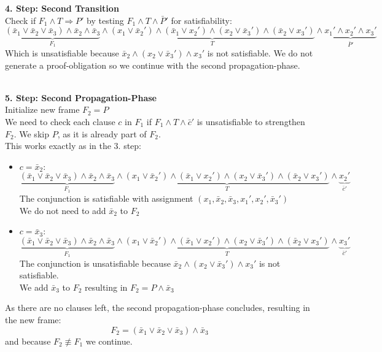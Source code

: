 \documentclass[11pt, a4paper, BCOR=10mm, ngerman]{scrbook}
\begin{document}
\textbf{4. Step: Second Transition} \\
Check if $F_1 \land T \Rightarrow P'$ by testing $F_1 \land T \land \bar P'$ for satisfiability: 
\begin{equation*}
\underbrace{(\bar x_1 \lor \bar x_2 \lor \bar x_3) \land \bar x_2 \land \bar x_3}_{F_1} \land \underbrace{(x_1 \lor \bar x_2' ) \land ( \bar x_1 \lor x_2') \land (x_2 \lor \bar x_3') \land ( \bar x_2 \lor x_3')}_{T} \land \underbrace{x_1' \land x_2' \land x_3'}_{ \bar P'}
\end{equation*}
Which is unsatisfiable because $\bar x_2 \land (x_2 \lor \bar x_3') \land x_3'$ is not satisfiable. We do not generate a proof-obligation so we continue with the second propagation-phase. \\ \\ \par

\textbf{5. Step: Second Propagation-Phase} \\
Initialize new frame $F_2 = P$ \\
We need to check each clause $c$ in $F_1$ if $F_1 \land T \land \bar c'$ is unsatisfiable to strengthen $F_2$. We skip $P$, as it is already part of $F_2$. \\ 
This works exactly as in the 3. step: \par
\begin{itemize}
\item $c = \bar x_2:$ 
\begin{equation*}
\underbrace{(\bar x_1 \lor \bar x_2 \lor \bar x_3) \land \bar x_2 \land \bar x_3}_{F_1} \land \underbrace{(x_1 \lor \bar x_2' ) \land ( \bar x_1 \lor x_2') \land (x_2 \lor \bar x_3') \land ( \bar x_2 \lor x_3')}_{T} \land \underbrace{x_2'}_{\bar c'}
\end{equation*}
The conjunction is satisfiable with assignment $(x_1, \bar x_2, \bar x_3, x_1', x_2', \bar x_3')$ \\
We do not need to add $\bar x_2$ to $F_2$ \\

\item $c = \bar x_3:$ 
\begin{equation*} 
\underbrace{(\bar x_1 \lor \bar x_2 \lor \bar x_3) \land \bar x_2 \land \bar x_3}_{F_1} \land \underbrace{(x_1 \lor \bar x_2' ) \land ( \bar x_1 \lor x_2') \land (x_2 \lor \bar x_3') \land ( \bar x_2 \lor x_3')}_{T} \land \underbrace{x_3'}_{\bar c'}
\end{equation*}
The conjunction is unsatisfiable because $\bar x_2 \land (x_2 \lor \bar x_3') \land x_3'$ is not satisfiable. \\ We add $\bar x_3$ to $F_2$ resulting in $F_2 = P \land \bar x_3$
\end{itemize}
As there are no clauses left, the second propagation-phase concludes, resulting in the new frame:
\begin{equation*}
F_2 = (\bar x_1 \lor \bar x_2 \lor \bar x_3) \land \bar x_3
\end{equation*}
and because $F_2 \not\equiv F_1$ we continue. \\ \\
\end{document}
